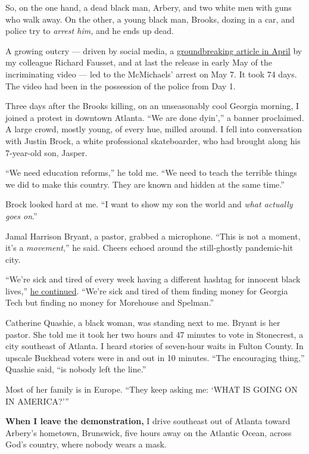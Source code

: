 So, on the one hand, a dead black man, Arbery, and two white men with
guns who walk away. On the other, a young black man, Brooks, dozing in a
car, and police try to \emph{arrest him,} and he ends up dead.

A growing outcry --- driven by social media, a
\href{https://www.nytimes.com/2020/04/26/us/ahmed-arbery-shooting-georgia.html}{groundbreaking
article in April} by my colleague Richard Fausset, and at last the
release in early May of the incriminating video --- led to the
McMichaels' arrest on May 7. It took 74 days. The video had been in the
possession of the police from Day 1.

Three days after the Brooks killing, on an unseasonably cool Georgia
morning, I joined a protest in downtown Atlanta. ``We are done dyin',''
a banner proclaimed. A large crowd, mostly young, of every hue, milled
around. I fell into conversation with Justin Brock, a white professional
skateboarder, who had brought along his 7-year-old son, Jasper.

``We need education reforms,'' he told me. ``We need to teach the
terrible things we did to make this country. They are known and hidden
at the same time.''

Brock looked hard at me. ``I want to show my son the world and
\emph{what actually goes on}.''

Jamal Harrison Bryant, a pastor, grabbed a microphone. ``This is not a
moment, it's a \emph{movement},'' he said. Cheers echoed around the
still-ghostly pandemic-hit city.

``We're sick and tired of every week having a different hashtag for
innocent black lives,''
\href{https://www.facebook.com/jamalbryant/videos/2020-naacp-georgia-march-to-state-capital/2797160607062525/}{he
continued}. ``We're sick and tired of them finding money for Georgia
Tech but finding no money for Morehouse and Spelman.''

Catherine Quashie, a black woman, was standing next to me. Bryant is her
pastor. She told me it took her two hours and 47 minutes to vote in
Stonecrest, a city southeast of Atlanta. I heard stories of seven-hour
waits in Fulton County. In upscale Buckhead voters were in and out in 10
minutes. ``The encouraging thing,'' Quashie said, ``is nobody left the
line.''

Most of her family is in Europe. ``They keep asking me: `WHAT IS GOING
ON IN AMERICA?'''

\textbf{When I leave the demonstration,} I drive southeast out of
Atlanta toward Arbery's hometown, Brunswick, five hours away on the
Atlantic Ocean, across God's country, where nobody wears a mask.


